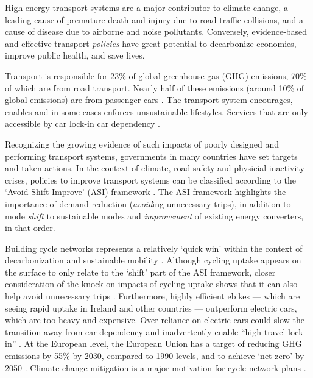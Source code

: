 \documentclass[
  super,
  preprint,
  3p]{elsarticle}
\begin{document}
High energy transport systems are a major contributor to climate change,
a leading cause of premature death and injury due to road traffic
collisions, and a cause of disease due to airborne and noise pollutants.
Conversely, evidence-based and effective transport \emph{policies} have
great potential to decarbonize economies, improve public health, and
save lives.

Transport is responsible for 23\% of global greenhouse gas (GHG)
emissions, 70\% of which are from road transport. Nearly half of these
emissions (around 10\% of global emissions) are from passenger cars
\citep{jaramillo2022}. The transport system encourages, enables and in
some cases enforces unsustainable lifestyles. Services that are only
accessible by car lock-in car dependency
\citep{gray2001, shergold2012, motte-baumvol2010}.

Recognizing the growing evidence of such impacts of poorly designed and
performing transport systems, governments in many countries have set
targets and taken actions. In the context of climate, road safety and
physicial inactivity crises, policies to improve transport systems can
be classified according to the `Avoid-Shift-Improve' (ASI) framework
\citep{jaramillo2022}. The ASI framework highlights the importance of
demand reduction (\emph{avoid}ing unnecessary trips), in addition to
mode \emph{shift} to sustainable modes and \emph{improvement} of
existing energy converters, in that order.

Building cycle networks represents a relatively `quick win' within the
context of decarbonization \citep{brand2020} and sustainable mobility
\citep{burns2013}. Although cycling uptake appears on the surface to
only relate to the `shift' part of the ASI framework, closer
consideration of the knock-on impacts of cycling uptake shows that it
can also help avoid unnecessary trips \citep{nello-deakin2020}.
Furthermore, highly efficient ebikes --- which are seeing rapid uptake
in Ireland and other countries --- outperform electric cars, which are
too heavy and expensive. Over-reliance on electric cars could slow the
transition away from car dependency and inadvertently enable ``high
travel lock-in'' \citep{anable2019}. At the European level, the European
Union has a target of reducing GHG emissions by 55\% by 2030, compared
to 1990 levels, and to achieve `net-zero' by 2050 \citep{rosenow2022}.
Climate change mitigation is a major motivation for cycle network plans
\citep{scappini2022}.
\end{document}

